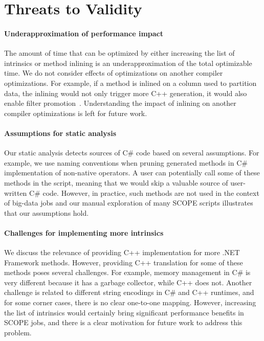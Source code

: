 \section{Threats to Validity}

\paragraph{Underapproximation of performance impact}
The amount of time that can be optimized by either increasing the list of intrinsics or method inlining is an underapproximation of the total optimizable time.
We do not consider effects of optimizations on another compiler optimizations.
For example, if a method is inlined on a column used to partition data, the inlining would not only trigger more C++ generation, it would also enable filter promotion~\cite{Darlington78}.
Understanding the impact of inlining on another compiler optimizations is left for future work.

\paragraph{Assumptions for static analysis}
Our static analysis detects sources of C\# code based on several assumptions.
For example, we use naming conventions when pruning generated methods in C\# implementation of non-native operators.
A user can potentially call some of these methods in the script, meaning that we would skip a valuable source of user-written C\# code.
However, in practice, such methods are not used in the context of big-data jobs and our manual exploration of many SCOPE scripts illustrates that our assumptions hold.

\paragraph{Challenges for implementing more intrinsics}
We discuss the relevance of providing C++ implementation for more .NET Framework methods.
However, providing C++ translation for some of these methods poses several challenges.
For example, memory management in C\# is very different because it has a garbage collector, while C++ does not.
Another challenge is related to different string encodings in C\# and C++ runtimes, and for some corner cases, there is no clear one-to-one mapping.
However, increasing the list of intrinsics would certainly bring significant performance benefits in SCOPE jobs, and there is a clear motivation for future work to address this problem.  
